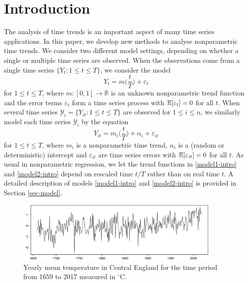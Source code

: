 
\section{Introduction}\label{sec-intro}


The analysis of time trends is an important aspect of many time series applications. In this paper, we develop new methods to analyse nonparametric time trends. 
We consider two different model settings, depending on whether a single or multiple time series are observed. When the observations come from a single time series $\{ Y_t: 1 \le t \le T \}$, we consider the model
\begin{equation}\label{model1-intro}
Y_t = m \Big( \frac{t}{T} \Big) + \varepsilon_t
\end{equation}
for $1 \le t \le T$, where $m: [0,1] \rightarrow \mathbb{R}$ is an unknown nonparametric trend function and the error terms $\varepsilon_t$ form a time series process with $\mathbb{E}[\varepsilon_t] = 0$ for all $t$. When several time series $\mathcal{Y}_i = \{ Y_{it}: 1 \le t \le T \}$ are observed for $1 \le i \le n$, we similarly model each time series $\mathcal{Y}_i$ by the equation
\begin{equation}\label{model2-intro}
Y_{it} = m_i \Big( \frac{t}{T} \Big) + \alpha_i + \varepsilon_{it}
\end{equation}
for $1 \le t \le T$, where $m_i$ is a nonparametric time trend, $\alpha_i$ is a (random or deterministic) intercept and $\varepsilon_{it}$ are time series errors with $\mathbb{E}[\varepsilon_{it}] = 0$ for all $t$. As usual in nonparametric regression, we let the trend functions in \eqref{model1-intro} and \eqref{model2-intro} depend on rescaled time $t/T$ rather than on real time $t$. A detailed description of models \eqref{model1-intro} and \eqref{model2-intro} is provided in Section \ref{sec-model}.


\begin{figure}
\centering
\includegraphics[width=0.9\textwidth]{Plots/temperature_data.pdf}
\vspace{0.2cm}

\caption{Yearly mean temperature in Central England for the time period from 1659 to 2017 measured in $^\circ$C.}\label{yearly_data}
\end{figure}


